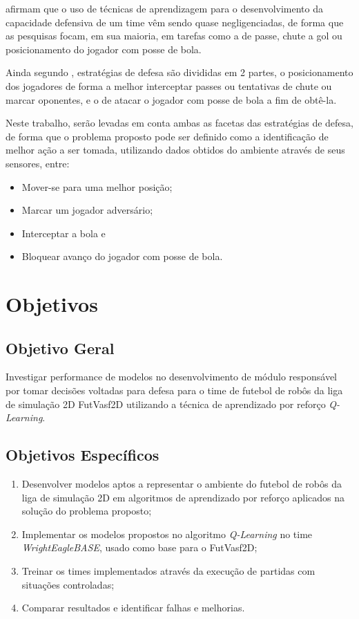  afirmam que o uso de técnicas de aprendizagem para o desenvolvimento da
capacidade defensiva de um time vêm sendo quase negligenciadas, de forma que as pesquisas focam, em
sua maioria, em tarefas como a de passe, chute a gol ou posicionamento do jogador com posse de bola.

Ainda segundo , estratégias de defesa são divididas em 2 partes, o
posicionamento dos jogadores de forma a melhor interceptar passes ou tentativas de chute ou marcar
oponentes, e o de atacar o jogador com posse de bola a fim de obtê-la.

Neste trabalho, serão levadas em conta ambas as facetas das estratégias de defesa, de forma que o
problema proposto pode ser definido como a identificação de melhor ação a ser tomada, utilizando
dados obtidos do ambiente através de seus sensores, entre:

\begin{itemize}
    \item Mover-se para uma melhor posição;
    \item Marcar um jogador adversário; 
    \item Interceptar a bola e
    \item Bloquear avanço do jogador com posse de bola.
\end{itemize}

\section{Objetivos}

\subsection{Objetivo Geral}

Investigar performance de modelos no desenvolvimento de módulo responsável por tomar decisões
voltadas para defesa para o time de futebol de robôs da liga de simulação 2D FutVasf2D utilizando a
técnica de aprendizado por reforço \textit{Q-Learning}.

\subsection{Objetivos Específicos}

\begin{enumerate}
    \item Desenvolver modelos aptos a representar o ambiente do futebol de robôs da liga de
    simulação 2D em algoritmos de aprendizado por reforço aplicados na solução do problema proposto;
    
    \item Implementar os modelos propostos no algoritmo \textit{Q-Learning} no time
    \textit{WrightEagleBASE}, usado como base para o FutVasf2D;
    
    \item Treinar os times implementados através da execução de partidas com situações controladas;
    
    \item Comparar resultados e identificar falhas e melhorias.
\end{enumerate}

